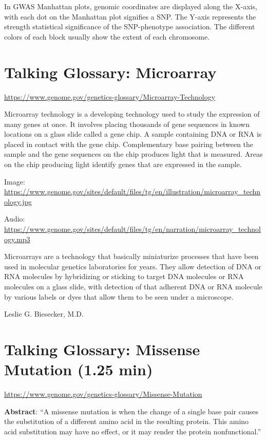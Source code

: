 \documentclass[
]{book}
\begin{document}
In GWAS Manhattan plots, genomic coordinates are displayed along the X-axis, with each dot on the Manhattan plot signifies a SNP. The Y-axis represents the strength statistical significance of the SNP-phenotype association. The different colors of each block usually show the extent of each chromosome.

\hypertarget{talking-glossary-microarray}{%
\section{Talking Glossary: Microarray}\label{talking-glossary-microarray}}

\url{https://www.genome.gov/genetics-glossary/Microarray-Technology}

Microarray technology is a developing technology used to study the expression of many genes at once. It involves placing thousands of gene sequences in known locations on a glass slide called a gene chip. A sample containing DNA or RNA is placed in contact with the gene chip. Complementary base pairing between the sample and the gene sequences on the chip produces light that is measured. Areas on the chip producing light identify genes that are expressed in the sample.

Image: \url{https://www.genome.gov/sites/default/files/tg/en/illustration/microarray_technology.jpg}

Audio: \url{https://www.genome.gov/sites/default/files/tg/en/narration/microarray_technology.mp3}

Microarrays are a technology that basically miniaturize processes that have been used in molecular genetics laboratories for years. They allow detection of DNA or RNA molecules by hybridizing or sticking to target DNA molecules or RNA molecules on a glass slide, with detection of that adherent DNA or RNA molecule by various labels or dyes that allow them to be seen under a microscope.

Leslie G. Biesecker, M.D.

\hypertarget{talking-glossary-missense-mutation-1.25-min}{%
\section{Talking Glossary: Missense Mutation (1.25 min)}\label{talking-glossary-missense-mutation-1.25-min}}

\url{https://www.genome.gov/genetics-glossary/Missense-Mutation}

\textbf{Abstract}: ``A missense mutation is when the change of a single base pair causes the substitution of a different amino acid in the resulting protein. This amino acid substitution may have no effect, or it may render the protein nonfunctional.''
\end{document}
